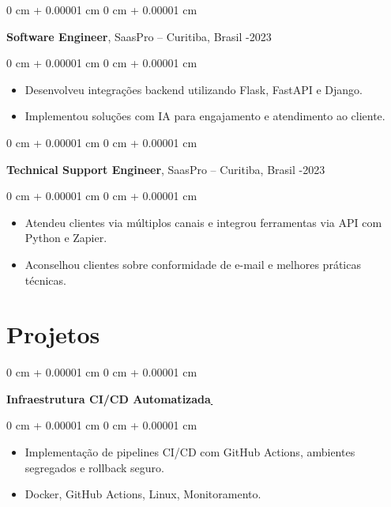 \documentclass[10pt, letterpaper]{article}
\newenvironment{highlights}{
    \begin{itemize}[
        topsep=0.10 cm,
        parsep=0.10 cm,
        partopsep=0pt,
        itemsep=0pt,
        leftmargin=0 cm + 10pt
    ]
}{
    \end{itemize}
}
\newenvironment{onecolentry}{
    \begin{adjustwidth}{
        0 cm + 0.00001 cm
    }{
        0 cm + 0.00001 cm
    }
}{
    \end{adjustwidth}
}
\begin{document}
    \begin{onecolentry}
        \setcolumnwidth{\fill, 4.5cm}
        \begin{paracol}{2}
            \textbf{Software Engineer}, SaasPro -- Curitiba, Brasil
            \switchcolumn
            -2023
        \end{paracol}
    \end{onecolentry}
    \vspace{0.10cm}
    \begin{onecolentry}
        \begin{highlights}
                    \item Desenvolveu integrações backend utilizando Flask, FastAPI e Django.
                \item Implementou soluções com IA para engajamento e atendimento ao cliente.
        \end{highlights}
    \end{onecolentry}
    
\vspace{0.2cm}

    \begin{onecolentry}
        \setcolumnwidth{\fill, 4.5cm}
        \begin{paracol}{2}
            \textbf{Technical Support Engineer}, SaasPro -- Curitiba, Brasil
            \switchcolumn
            -2023
        \end{paracol}
    \end{onecolentry}
    \vspace{0.10cm}
    \begin{onecolentry}
        \begin{highlights}
                    \item Atendeu clientes via múltiplos canais e integrou ferramentas via API com Python e Zapier.
                \item Aconselhou clientes sobre conformidade de e-mail e melhores práticas técnicas.
        \end{highlights}
    \end{onecolentry}
    
\section{Projetos}

    \begin{onecolentry}
        \textbf{Infraestrutura CI/CD Automatizada}\href{}{\, \faGithub}
    \end{onecolentry}
    \vspace{0.10cm}
    \begin{onecolentry}
        \begin{highlights}
                    \item Implementação de pipelines CI/CD com GitHub Actions, ambientes segregados e rollback seguro.
                \item Docker, GitHub Actions, Linux, Monitoramento.
        \end{highlights}
    \end{onecolentry}
    
\end{document}
